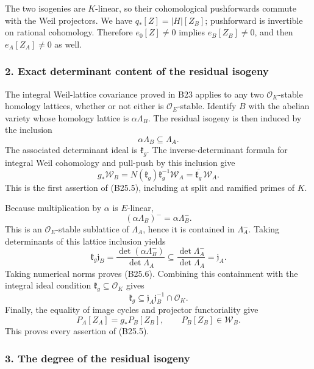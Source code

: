 \documentclass[11pt,a4paper]{article}
\theoremstyle{definition}
\begin{document}
The two isogenies are \(K\)-linear, so their cohomological pushforwards commute with the Weil projectors. We have \(q_*[Z]=|H|[Z_B]\); pushforward is invertible on rational cohomology. Therefore \(e_0[Z]\ne0\) implies \(e_B[Z_B]\ne0\), and then \(e_A[Z_A]\ne0\) as well.

\subsubsection{2. Exact determinant content of the residual isogeny}\label{exact-determinant-content-of-the-residual-isogeny}

The integral Weil-lattice covariance proved in B23 applies to any two \(\mathcal O_K\)-stable homology lattices, whether or not either is \(\mathcal O_E\)-stable. Identify \(B\) with the abelian variety whose homology lattice is \(\alpha\Lambda_B\). The residual isogeny is then induced by the inclusion \[
 \alpha\Lambda_B\subseteq\Lambda_A.
\] The associated determinant ideal is \(\mathfrak k_g\). The inverse-determinant formula for integral Weil cohomology and pull-push by this inclusion give \[
 g_*\mathscr W_B
 =N(\mathfrak k_g)\mathfrak k_g^{-1}\mathscr W_A
 =\overline{\mathfrak k_g}\,\mathscr W_A.
\] This is the first assertion of (B25.5), including at split and ramified primes of \(K\).

Because multiplication by \(\alpha\) is \(E\)-linear, \[
 (\alpha\Lambda_B)^-=\alpha\Lambda_B^-.
\] This is an \(\mathcal O_E\)-stable sublattice of \(\Lambda_A\), hence it is contained in \(\Lambda_A^-\). Taking determinants of this lattice inclusion yields \[
 \mathfrak k_g\mathfrak j_B
 =\frac{\det(\alpha\Lambda_B^-)}{\det\Lambda_A}
 \subseteq\frac{\det\Lambda_A^-}{\det\Lambda_A}
 =\mathfrak j_A.
\] Taking numerical norms proves (B25.6). Combining this containment with the integral ideal condition \(\mathfrak k_g\subseteq\mathcal O_K\) gives \[
 \mathfrak k_g\subseteq
 \mathfrak j_A\mathfrak j_B^{-1}\cap\mathcal O_K.
\] Finally, the equality of image cycles and projector functoriality give \[
 P_A[Z_A]=g_*P_B[Z_B],\qquad P_B[Z_B]\in\mathscr W_B.
\] This proves every assertion of (B25.5).

\subsubsection{3. The degree of the residual isogeny}\label{the-degree-of-the-residual-isogeny}
\end{document}
